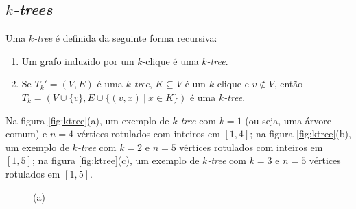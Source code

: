 \subsection{\emph{$k$-trees}}

\begin{definition}
  \label{def:ktree}
  \cite{harary} Uma \emph{$k$-tree} é definida da seguinte forma recursiva:

  \begin{enumerate}
    \item Um grafo induzido por um $k$-clique é uma \emph{$k$-tree}.
    \item Se $T_k' = (V, E)$ é uma \emph{$k$-tree}, $K \subseteq V$ é um $k$-clique e $v \not \in V$, então $T_k = (V \cup \{v\}, E \cup \{(v,x) \ | \  x \in K\})$ é uma \emph{$k$-tree}.
  \end{enumerate}

  Na figura \ref{fig:ktree}(a), um exemplo de \emph{$k$-tree} com $k = 1$ (ou seja, uma árvore comum) e $n = 4$ vértices rotulados com inteiros em $[1, 4]$; na figura \ref{fig:ktree}(b), um exemplo de \emph{$k$-tree} com $k = 2$ e $n = 5$ vértices rotulados com inteiros em $[1, 5]$; na figura \ref{fig:ktree}(c), um exemplo de \emph{$k$-tree} com $k = 3$ e $n = 5$ vértices rotulados em $[1, 5]$.

  \begin{figure}
    \begin{minipage}{0.3333\textwidth}
      \centering

      (a)
    \end{minipage}\begin{minipage}{0.3333\textwidth}
      \centering
\end{minipage}
\end{figure}
\end{definition}
